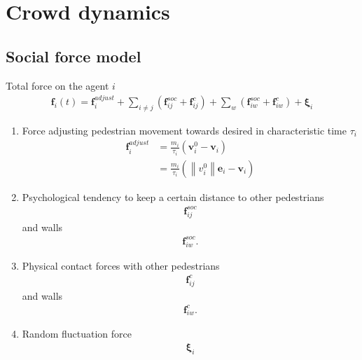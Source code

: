 \section{Crowd dynamics}
\subsection{Social force model}
Total force on the agent $ i $
\begin{align}
\mathbf{f}_{i}(t) = \mathbf{f}_{i}^{adjust} + \sum_{i\neq j}^{} \left(\mathbf{f}_{ij}^{soc} + \mathbf{f}_{ij}^{c}\right) + \sum_{w}^{} \left(\mathbf{f}_{iw}^{soc} + \mathbf{f}_{iw}^{c}\right) + \boldsymbol{\xi}_{i}
\end{align}

\begin{enumerate}[label=\roman{enumi})]
\item 
Force adjusting pedestrian movement towards desired in characteristic time $ \tau_{i} $
\begin{align}
\mathbf{f}_{i}^{adjust} &= \frac{m_{i}}{\tau_{i}} (\mathbf{v}_{i}^{0} - \mathbf{v}_{i}) \\
&=  \frac{m_{i}}{\tau_{i}} (\left\|v_{i}^{0}\right\| \mathbf{e}_{i} - \mathbf{v}_{i})
\end{align}

\item 
Psychological tendency to keep a certain distance to other pedestrians
\begin{align}
\mathbf{f}_{ij}^{soc}
\end{align}
and walls
\begin{align}
\mathbf{f}_{iw}^{soc}.
\end{align}

\item 
Physical contact forces with other pedestrians
\begin{align}
\mathbf{f}_{ij}^{c}
\end{align}
and walls
\begin{align}
\mathbf{f}_{iw}^{c}.
\end{align}

\item 
Random fluctuation force
\begin{align}
\boldsymbol{\xi}_{i}
\end{align}

\end{enumerate}



